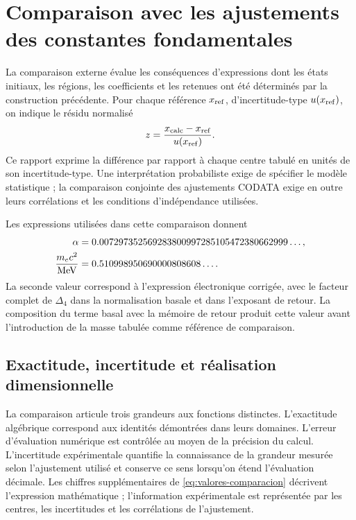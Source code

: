 \section{Comparaison avec les ajustements des constantes fondamentales}
\label{sec:comparacion}

La comparaison externe évalue les conséquences d'expressions dont les états initiaux, les régions, les coefficients et les retenues ont été déterminés par la construction précédente. Pour chaque référence \(x_{\rm ref}\), d'incertitude-type \(u(x_{\rm ref})\), on indique le résidu normalisé
\[
 z=\frac{x_{\rm calc}-x_{\rm ref}}{u(x_{\rm ref})}.
\]
Ce rapport exprime la différence par rapport à chaque centre tabulé en unités de son incertitude-type. Une interprétation probabiliste exige de spécifier le modèle statistique ; la comparaison conjointe des ajustements CODATA exige en outre leurs corrélations et les conditions d'indépendance utilisées.

Les expressions utilisées dans cette comparaison donnent
\begin{align}
 \alpha&=0.007297352569283800997285105472380662999\ldots,\notag\\
 \frac{m_ec^2}{\mathrm{MeV}}&=0.510998950690000808608\ldots.
 \label{eq:valores-comparacion}
\end{align}
La seconde valeur correspond à l'expression électronique corrigée, avec le facteur complet de \(\Delta_4\) dans la normalisation basale et dans l'exposant de retour. La composition du terme basal avec la mémoire de retour produit cette valeur avant l'introduction de la masse tabulée comme référence de comparaison.

\subsection{Exactitude, incertitude et réalisation dimensionnelle}

La comparaison articule trois grandeurs aux fonctions distinctes. L'exactitude algébrique correspond aux identités démontrées dans leurs domaines. L'erreur d'évaluation numérique est contrôlée au moyen de la précision du calcul. L'incertitude expérimentale quantifie la connaissance de la grandeur mesurée selon l'ajustement utilisé et conserve ce sens lorsqu'on étend l'évaluation décimale. Les chiffres supplémentaires de \eqref{eq:valores-comparacion} décrivent l'expression mathématique ; l'information expérimentale est représentée par les centres, les incertitudes et les corrélations de l'ajustement.

